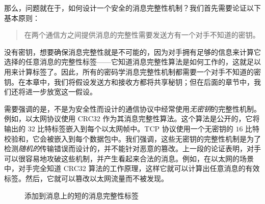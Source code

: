 那么，问题就在于，如何设计一个安全的消息完整性机制？我们首先需要论证以下基本原则：
\begin{quote}
在两个通信方之间提供消息的完整性需要发送方有一个对手不知道的密钥。
\end{quote}
没有密钥，想要确保消息完整性就是不可能的，因为对手拥有足够的信息来计算它选择的任意消息的完整性标签——它知道消息完整性算法是如何工作的，这就足以用来计算标签了。因此，所有的密码学消息完整性机制都需要一个对手不知道的密钥。在本章中，我们将假设发送方和接收方都将共享秘钥；但在后面的章节中，我们还将进一步放宽这一假设。

需要强调的是，不是为安全性而设计的通信协议中经常使用\emph{无密钥}的完整性机制。例如，以太网协议使用 CRC32 作为其消息完整性算法。这个算法是公开的，它将输出的 $32$ 比特标签嵌入到每个以太网帧中。TCP 协议使用一个无密钥的 $16$ 比特校验和，它会被嵌入到每个数据包中。我们强调，这些无密钥的完整性机制是为了检测\emph{随机的}传输错误而设计的，并不能针对恶意的篡改。上一段的论证表明，对手可以很容易地攻破这些机制，并产生看起来合法的消息。例如，在以太网的场景中，对手完全知道 CRC32 算法的工作原理，这样它就可以计算出任意消息的有效标签。然后，它就可以篡改以太网流量而不被发现。

\begin{figure}
  \centering
  
  \caption{添加到消息上的短的消息完整性标签}
  \label{fig:6-1}
\end{figure}














